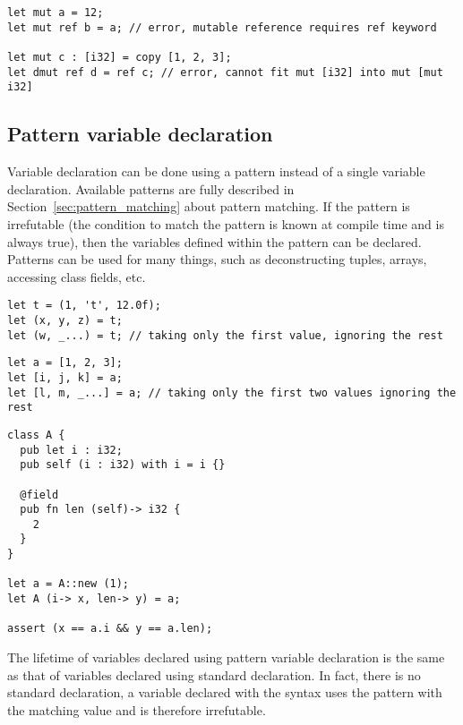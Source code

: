 \begin{lstlisting}[style=coloredverbatim]
let mut a = 12;
let mut ref b = a; // error, mutable reference requires ref keyword

let mut c : [i32] = copy [1, 2, 3];
let dmut ref d = ref c; // error, cannot fit mut [i32] into mut [mut i32]
\end{lstlisting}


\subsection{Pattern variable declaration}
\label{sec:pattern_vdecl}

Variable declaration can be done using a pattern instead of a single variable
declaration. Available patterns are fully described in
Section~\ref{sec:pattern_matching} about pattern matching. If the pattern is
irrefutable (the condition to match the pattern is known at compile time and is
always true), then the variables defined within the pattern can be declared.
Patterns can be used for many things, such as deconstructing tuples, arrays,
accessing class fields, etc.
\begin{lstlisting}[style=coloredverbatim, caption=Tuple deconstruction]
let t = (1, 't', 12.0f);
let (x, y, z) = t;
let (w, _...) = t; // taking only the first value, ignoring the rest
\end{lstlisting}

\begin{lstlisting}[style=coloredverbatim, caption=Array deconstruction]
let a = [1, 2, 3];
let [i, j, k] = a;
let [l, m, _...] = a; // taking only the first two values ignoring the rest
\end{lstlisting}

\begin{lstlisting}[style=coloredverbatim, caption=Class field access]
class A {
  pub let i : i32;
  pub self (i : i32) with i = i {}

  @field
  pub fn len (self)-> i32 {
    2
  }
}

let a = A::new (1);
let A (i-> x, len-> y) = a;

assert (x == a.i && y == a.len);
\end{lstlisting}

The lifetime of variables declared using pattern variable declaration is the
same as that of variables declared using standard declaration. In fact, there is
no standard declaration, a variable declared with the syntax  uses the pattern  with the matching value 
and is therefore irrefutable.

